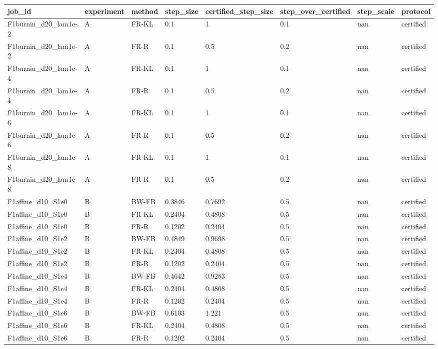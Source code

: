 \begin{tabular}{llllllll}
\toprule
job\_id & experiment & method & step\_size & certified\_step\_size & step\_over\_certified & step\_scale & protocol \\
\midrule
F1burnin\_d20\_lam1e-2 & A & FR-KL & 0.1 & 1 & 0.1 & nan & certified \\
F1burnin\_d20\_lam1e-2 & A & FR-R & 0.1 & 0.5 & 0.2 & nan & certified \\
F1burnin\_d20\_lam1e-4 & A & FR-KL & 0.1 & 1 & 0.1 & nan & certified \\
F1burnin\_d20\_lam1e-4 & A & FR-R & 0.1 & 0.5 & 0.2 & nan & certified \\
F1burnin\_d20\_lam1e-6 & A & FR-KL & 0.1 & 1 & 0.1 & nan & certified \\
F1burnin\_d20\_lam1e-6 & A & FR-R & 0.1 & 0.5 & 0.2 & nan & certified \\
F1burnin\_d20\_lam1e-8 & A & FR-KL & 0.1 & 1 & 0.1 & nan & certified \\
F1burnin\_d20\_lam1e-8 & A & FR-R & 0.1 & 0.5 & 0.2 & nan & certified \\
F1affine\_d10\_S1e0 & B & BW-FB & 0.3846 & 0.7692 & 0.5 & nan & certified \\
F1affine\_d10\_S1e0 & B & FR-KL & 0.2404 & 0.4808 & 0.5 & nan & certified \\
F1affine\_d10\_S1e0 & B & FR-R & 0.1202 & 0.2404 & 0.5 & nan & certified \\
F1affine\_d10\_S1e2 & B & BW-FB & 0.4849 & 0.9698 & 0.5 & nan & certified \\
F1affine\_d10\_S1e2 & B & FR-KL & 0.2404 & 0.4808 & 0.5 & nan & certified \\
F1affine\_d10\_S1e2 & B & FR-R & 0.1202 & 0.2404 & 0.5 & nan & certified \\
F1affine\_d10\_S1e4 & B & BW-FB & 0.4642 & 0.9283 & 0.5 & nan & certified \\
F1affine\_d10\_S1e4 & B & FR-KL & 0.2404 & 0.4808 & 0.5 & nan & certified \\
F1affine\_d10\_S1e4 & B & FR-R & 0.1202 & 0.2404 & 0.5 & nan & certified \\
F1affine\_d10\_S1e6 & B & BW-FB & 0.6103 & 1.221 & 0.5 & nan & certified \\
F1affine\_d10\_S1e6 & B & FR-KL & 0.2404 & 0.4808 & 0.5 & nan & certified \\
F1affine\_d10\_S1e6 & B & FR-R & 0.1202 & 0.2404 & 0.5 & nan & certified \\

\end{tabular}
